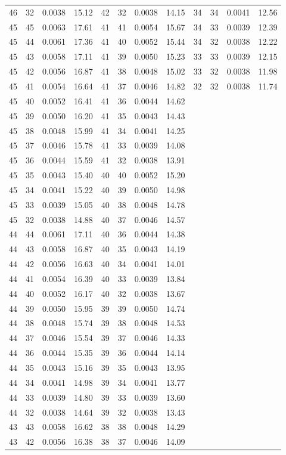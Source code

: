 \begin{tabular}{llll|llll|llll}
46 & 32 & 0.0038 & 15.12 & 42 & 32 & 0.0038 & 14.15 & 34 & 34 & 0.0041 & 12.56\\
45 & 45 & 0.0063 & 17.61 & 41 & 41 & 0.0054 & 15.67 & 34 & 33 & 0.0039 & 12.39\\
45 & 44 & 0.0061 & 17.36 & 41 & 40 & 0.0052 & 15.44 & 34 & 32 & 0.0038 & 12.22\\
45 & 43 & 0.0058 & 17.11 & 41 & 39 & 0.0050 & 15.23 & 33 & 33 & 0.0039 & 12.15\\
45 & 42 & 0.0056 & 16.87 & 41 & 38 & 0.0048 & 15.02 & 33 & 32 & 0.0038 & 11.98\\
45 & 41 & 0.0054 & 16.64 & 41 & 37 & 0.0046 & 14.82 & 32 & 32 & 0.0038 & 11.74\\
45 & 40 & 0.0052 & 16.41 & 41 & 36 & 0.0044 & 14.62 &  &  &  & \\
45 & 39 & 0.0050 & 16.20 & 41 & 35 & 0.0043 & 14.43 &  &  &  & \\
45 & 38 & 0.0048 & 15.99 & 41 & 34 & 0.0041 & 14.25 &  &  &  & \\
45 & 37 & 0.0046 & 15.78 & 41 & 33 & 0.0039 & 14.08 &  &  &  & \\
45 & 36 & 0.0044 & 15.59 & 41 & 32 & 0.0038 & 13.91 &  &  &  & \\
45 & 35 & 0.0043 & 15.40 & 40 & 40 & 0.0052 & 15.20 &  &  &  & \\
45 & 34 & 0.0041 & 15.22 & 40 & 39 & 0.0050 & 14.98 &  &  &  & \\
45 & 33 & 0.0039 & 15.05 & 40 & 38 & 0.0048 & 14.78 &  &  &  & \\
45 & 32 & 0.0038 & 14.88 & 40 & 37 & 0.0046 & 14.57 &  &  &  & \\
44 & 44 & 0.0061 & 17.11 & 40 & 36 & 0.0044 & 14.38 &  &  &  & \\
44 & 43 & 0.0058 & 16.87 & 40 & 35 & 0.0043 & 14.19 &  &  &  & \\
44 & 42 & 0.0056 & 16.63 & 40 & 34 & 0.0041 & 14.01 &  &  &  & \\
44 & 41 & 0.0054 & 16.39 & 40 & 33 & 0.0039 & 13.84 &  &  &  & \\
44 & 40 & 0.0052 & 16.17 & 40 & 32 & 0.0038 & 13.67 &  &  &  & \\
44 & 39 & 0.0050 & 15.95 & 39 & 39 & 0.0050 & 14.74 &  &  &  & \\
44 & 38 & 0.0048 & 15.74 & 39 & 38 & 0.0048 & 14.53 &  &  &  & \\
44 & 37 & 0.0046 & 15.54 & 39 & 37 & 0.0046 & 14.33 &  &  &  & \\
44 & 36 & 0.0044 & 15.35 & 39 & 36 & 0.0044 & 14.14 &  &  &  & \\
44 & 35 & 0.0043 & 15.16 & 39 & 35 & 0.0043 & 13.95 &  &  &  & \\
44 & 34 & 0.0041 & 14.98 & 39 & 34 & 0.0041 & 13.77 &  &  &  & \\
44 & 33 & 0.0039 & 14.80 & 39 & 33 & 0.0039 & 13.60 &  &  &  & \\
44 & 32 & 0.0038 & 14.64 & 39 & 32 & 0.0038 & 13.43 &  &  &  & \\
43 & 43 & 0.0058 & 16.62 & 38 & 38 & 0.0048 & 14.29 &  &  &  & \\
43 & 42 & 0.0056 & 16.38 & 38 & 37 & 0.0046 & 14.09 &  &  &  & \\
\bottomrule
\end{tabular}
\newpage
